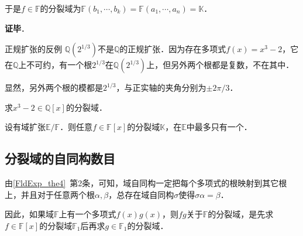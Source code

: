 于是$f\in\mathbb{F}$的分裂域为$\mathbb{F}(b_1, \cdots, b_k)=\mathbb{F}(a_1, \cdots, a_n)=\mathbb{K}$．

\textbf{证毕}．








\begin{example}{正规扩张的反例}
$\mathbb{Q}(2^{1/3})$不是$\mathbb{Q}$的正规扩张．因为存在多项式$f(x)=x^3-2$，它在$\mathbb{Q}$上不可约，有一个根$2^{1/3}$在$\mathbb{Q}(2^{1/3})$上，但另外两个根都是复数，不在其中．

显然，另外两个根的模都是$2^{1/3}$，与正实轴的夹角分别为$\pm 2\pi/3$．
\end{example}

\begin{exercise}{}
求$x^3-2\in\mathbb{Q}[x]$的分裂域．
\end{exercise}



\begin{corollary}{}
设有域扩张$\mathbb{E}/\mathbb{F}$．则任意$f\in\mathbb{F}[x]$的分裂域$\mathbb{K}$，在$\mathbb{E}$中最多只有一个．
\end{corollary}









\subsection{分裂域的自同构数目}

由\autoref{FldExp_the4}~第2条，可知，域自同构一定把每个多项式的根映射到其它根上，并且对于任意两个根$\alpha, \beta$，总存在域自同构$\sigma$使得$\sigma \alpha=\beta$．

因此，如果域$\mathbb{F}$上有一个多项式$f(x)g(x)$，则$fg$关于$\mathbb{F}$的分裂域，是先求$f\in\mathbb{F}[x]$的分裂域$\mathbb{F}_1$后再求$g\in\mathbb{F}_1$的分裂域．


